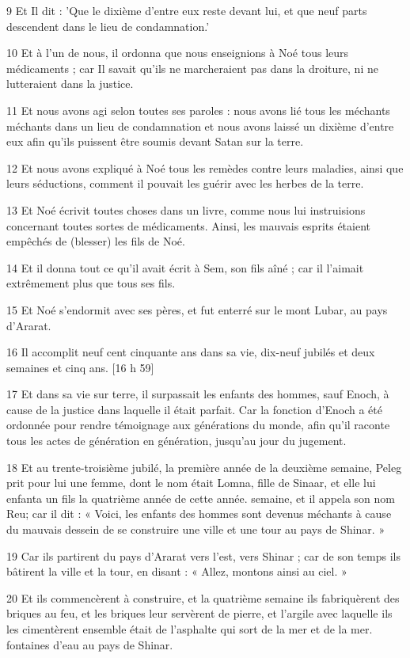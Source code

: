 \par 9 Et Il dit : 'Que le dixième d'entre eux reste devant lui, et que neuf parts descendent dans le lieu de condamnation.'
\par 10 Et à l'un de nous, il ordonna que nous enseignions à Noé tous leurs médicaments ; car Il savait qu’ils ne marcheraient pas dans la droiture, ni ne lutteraient dans la justice.
\par 11 Et nous avons agi selon toutes ses paroles : nous avons lié tous les méchants méchants dans un lieu de condamnation et nous avons laissé un dixième d'entre eux afin qu'ils puissent être soumis devant Satan sur la terre.
\par 12 Et nous avons expliqué à Noé tous les remèdes contre leurs maladies, ainsi que leurs séductions, comment il pouvait les guérir avec les herbes de la terre.
\par 13 Et Noé écrivit toutes choses dans un livre, comme nous lui instruisions concernant toutes sortes de médicaments. Ainsi, les mauvais esprits étaient empêchés de (blesser) les fils de Noé.
\par 14 Et il donna tout ce qu'il avait écrit à Sem, son fils aîné ; car il l'aimait extrêmement plus que tous ses fils.
\par 15 Et Noé s'endormit avec ses pères, et fut enterré sur le mont Lubar, au pays d'Ararat.
\par 16 Il accomplit neuf cent cinquante ans dans sa vie, dix-neuf jubilés et deux semaines et cinq ans. [16 h 59]
\par 17 Et dans sa vie sur terre, il surpassait les enfants des hommes, sauf Enoch, à cause de la justice dans laquelle il était parfait. Car la fonction d'Enoch a été ordonnée pour rendre témoignage aux générations du monde, afin qu'il raconte tous les actes de génération en génération, jusqu'au jour du jugement.
\par 18 Et au trente-troisième jubilé, la première année de la deuxième semaine, Peleg prit pour lui une femme, dont le nom était Lomna, fille de Sinaar, et elle lui enfanta un fils la quatrième année de cette année. semaine, et il appela son nom Reu; car il dit : « Voici, les enfants des hommes sont devenus méchants à cause du mauvais dessein de se construire une ville et une tour au pays de Shinar. »
\par 19 Car ils partirent du pays d'Ararat vers l'est, vers Shinar ; car de son temps ils bâtirent la ville et la tour, en disant : « Allez, montons ainsi au ciel. »
\par 20 Et ils commencèrent à construire, et la quatrième semaine ils fabriquèrent des briques au feu, et les briques leur servèrent de pierre, et l'argile avec laquelle ils les cimentèrent ensemble était de l'asphalte qui sort de la mer et de la mer. fontaines d'eau au pays de Shinar.
